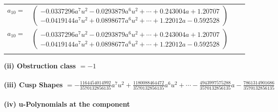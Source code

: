 \documentclass[1p]{elsarticle_modified}
\theoremstyle{definition}
\begin{document}
\begin{tabular}{m{7pt} m{180pt} m{7pt} m{180pt} }
\flushright $a_{10}=$&$\begin{pmatrix}-0.0337296 a^{7} u^{2}-0.0293879 a^{6} u^{2}+\cdots+0.243004 a+1.20707\\-0.0419144 a^{7} u^{2}+0.0898677 a^{6} u^{2}+\cdots+1.22012 a-0.592528\end{pmatrix}$\\ \flushright $a_{10}=$&$\begin{pmatrix}-0.0337296 a^{7} u^{2}-0.0293879 a^{6} u^{2}+\cdots+0.243004 a+1.20707\\-0.0419144 a^{7} u^{2}+0.0898677 a^{6} u^{2}+\cdots+1.22012 a-0.592528\end{pmatrix}$\\&\end{tabular}
\flushleft \textbf{(ii) Obstruction class $= -1$}\\~\\
\flushleft \textbf{(iii) Cusp Shapes $= -\frac{1164454014992}{3570132856135} a^7 u^2+\frac{1180088464472}{3570132856135} a^6 u^2+\cdots-\frac{4943997575288}{3570132856135} a-\frac{7861314901686}{3570132856135}$}\\~\\
\newpage\renewcommand{\arraystretch}{1}
\flushleft \textbf{(iv) u-Polynomials at the component}\newline \\
\end{document}
